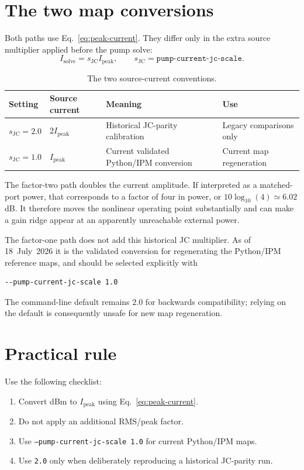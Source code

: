 \documentclass[11pt,a4paper]{article}
\begin{document}
\section{The two map conversions}

Both paths use Eq.~\eqref{eq:peak-current}.  They differ only in the extra
source multiplier applied before the pump solve:
\begin{equation}
  I_{\mathrm{solve}}=s_{\mathrm{JC}}I_{\mathrm{peak}},
  \qquad s_{\mathrm{JC}}=\texttt{pump-current-jc-scale}.
\end{equation}

\begin{table}[h]
\centering
\begin{tabular}{@{}llll@{}}
\toprule
Setting & Source current & Meaning & Use \\
\midrule
$s_{\mathrm{JC}}=2.0$
  & $2I_{\mathrm{peak}}$
  & Historical JC-parity calibration
  & Legacy comparisons only \\
$s_{\mathrm{JC}}=1.0$
  & $I_{\mathrm{peak}}$
  & Current validated Python/IPM conversion
  & Current map regeneration \\
\bottomrule
\end{tabular}
\caption{The two source-current conventions.}
\end{table}

The factor-two path doubles the current amplitude.  If interpreted as a
matched-port power, that corresponds to a factor of four in power, or
$10\log_{10}(4)\simeq6.02$ dB.  It therefore moves the nonlinear operating
point substantially and can make a gain ridge appear at an apparently
unreachable external power.

The factor-one path does not add this historical JC multiplier.  As of
18~July~2026 it is the validated conversion for regenerating the Python/IPM
reference maps, and should be selected explicitly with
\begin{verbatim}
--pump-current-jc-scale 1.0
\end{verbatim}
The command-line default remains $2.0$ for backwards compatibility; relying
on the default is consequently unsafe for new map regeneration.

\section{Practical rule}

Use the following checklist:
\begin{enumerate}
  \item Convert dBm to $I_{\mathrm{peak}}$ using Eq.~\eqref{eq:peak-current}.
  \item Do not apply an additional RMS/peak factor.
  \item Use \texttt{--pump-current-jc-scale 1.0} for current Python/IPM maps.
  \item Use \texttt{2.0} only when deliberately reproducing a historical
        JC-parity run.
\end{enumerate}
\end{document}
